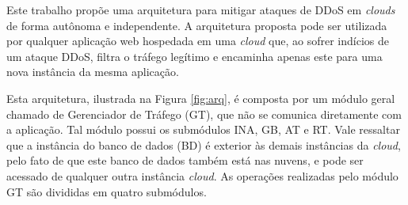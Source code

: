 



Este trabalho propõe uma arquitetura para mitigar ataques de DDoS em \emph{clouds} de forma autônoma e independente. A arquitetura proposta pode ser utilizada por qualquer aplicação web hospedada em uma \emph{cloud} que, ao sofrer indícios de um ataque DDoS, filtra o tráfego legítimo e encaminha apenas este para uma nova instância da mesma aplicação. 

Esta arquitetura, ilustrada na Figura \ref{fig:arq}, é composta por um módulo geral chamado de Gerenciador de Tráfego (GT), que não se comunica diretamente com a aplicação. Tal módulo possui os submódulos INA, GB, AT e RT. Vale ressaltar que a instância do banco de dados (BD) é exterior às demais instâncias da \emph{cloud}, pelo fato de que este banco de dados também está nas nuvens, e pode ser acessado de qualquer outra instância \emph{cloud}. As operações realizadas pelo módulo GT são divididas em quatro submódulos.

